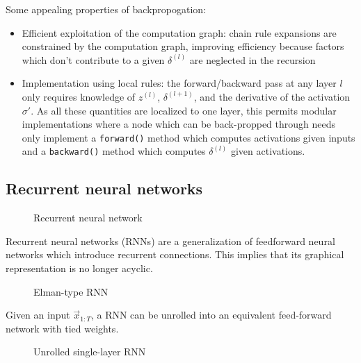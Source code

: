 Some appealing properties of backpropogation:
\begin{itemize}
    \item Efficient exploitation of the computation graph: chain rule expansions
        are constrained by the computation graph, improving efficiency
        because factors which don't contribute to a given $\delta^{(l)}$
        are neglected in the recursion
    \item Implementation using local rules: the forward/backward pass
        at any layer $l$ only requires knowledge of $z^{(l)}$, $\delta^{(l+1)}$,
        and the derivative of the activation $\sigma'$. As all these quantities are localized
        to one layer, this permits modular implementations where a node which can be back-propped
        through needs only implement a \texttt{forward()} method which computes activations
        given inputs and a \texttt{backward()} method which computes $\delta^{(l)}$ given
        activations.
\end{itemize}


\subsection{Recurrent neural networks}

\begin{figure}[htpb]
    \centering
    
    \caption{Recurrent neural network}
    \label{fig:nn-rnn}
\end{figure}


Recurrent neural networks (RNNs) are a generalization of feedforward neural
networks which introduce recurrent connections. This implies that its graphical
representation is no longer acyclic.

\begin{figure}[htpb]
    \centering
    
    \caption{Elman-type RNN}
    \label{fig:rnn-elman}
\end{figure}


Given an input $\vec{x}_{1:T}$, a RNN can be unrolled into an equivalent feed-forward
network with tied weights.

\begin{figure}[htpb]
    \centering
    
    \caption{Unrolled single-layer RNN}
    \label{fig:rnn-single-unrolled}
\end{figure}

